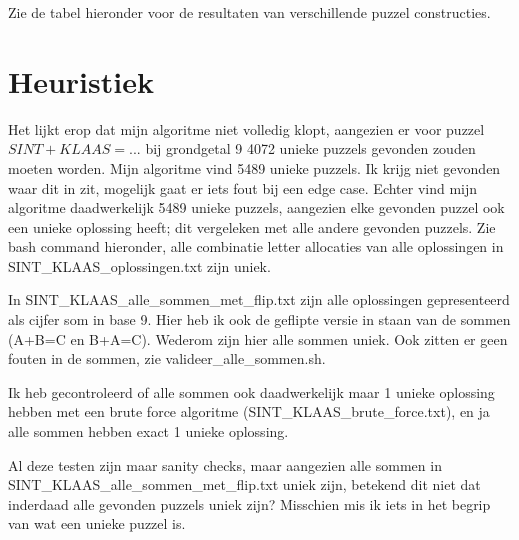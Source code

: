 \documentclass[twocolumn,10pt]{article}
\begin{document}
Zie de tabel hieronder voor de resultaten van verschillende puzzel constructies.
\begin{table}[h]
    \centering
    \caption{Resultaten van verschillende constructies.}
\end{table}
\FloatBarrier

\section*{Heuristiek}
Het lijkt erop dat mijn algoritme niet volledig klopt, aangezien er voor puzzel $SINT+KLAAS=...$ bij grondgetal 9 4072 unieke puzzels gevonden zouden moeten worden.
Mijn algoritme vind 5489 unieke puzzels. Ik krijg niet gevonden waar dit in zit, mogelijk gaat er iets fout bij een edge case. 
Echter vind mijn algoritme daadwerkelijk 5489 unieke puzzels, aangezien elke gevonden puzzel ook een unieke oplossing heeft; dit vergeleken met alle andere gevonden puzzels.
Zie bash command hieronder, alle combinatie letter allocaties van alle oplossingen in SINT\_KLAAS\_oplossingen.txt zijn uniek.

In SINT\_KLAAS\_alle\_sommen\_met\_flip.txt zijn alle oplossingen gepresenteerd als cijfer som in base 9.
Hier heb ik ook de geflipte versie in staan van de sommen (A+B=C en B+A=C).
Wederom zijn hier alle sommen uniek.
Ook zitten er geen fouten in de sommen, zie valideer\_alle\_sommen.sh.

Ik heb gecontroleerd of alle sommen ook daadwerkelijk maar 1 unieke oplossing hebben met een brute force algoritme (SINT\_KLAAS\_brute\_force.txt), en ja alle sommen hebben exact 1 unieke oplossing.

Al deze testen zijn maar sanity checks, maar aangezien alle sommen in SINT\_KLAAS\_alle\_sommen\_met\_flip.txt uniek zijn, betekend dit niet dat inderdaad alle gevonden puzzels uniek zijn? 
Misschien mis ik iets in het begrip van wat een unieke puzzel is.
\end{document}
